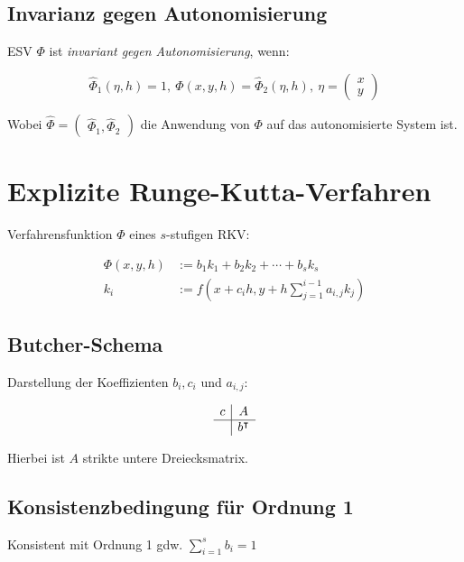 \subsection*{Invarianz gegen Autonomisierung}

ESV $\Phi$ ist \emph{invariant gegen Autonomisierung}, wenn:

$$\widehat{\Phi}_1(\eta,h)=1, \ \Phi(x,y,h) = \widehat{\Phi}_2(\eta,h), \ \eta = \begin{pmatrix}x \\ y\end{pmatrix}$$

Wobei $\widehat{\Phi} = \begin{pmatrix}\widehat{\Phi}_1, \widehat{\Phi}_2\end{pmatrix}$ die Anwendung von $\Phi$ auf das autonomisierte System ist.

\section*{Explizite Runge-Kutta-Verfahren}

Verfahrensfunktion $\Phi$ eines $s$-stufigen RKV:

\vspace*{-4mm}
\begin{align*}
\Phi(x,y,h) &:= b_1 k_1 + b_2 k_2 + \cdots + b_s k_s \\
k_i &:= f(x+c_i h, y + h \sum_{j=1}^{i-1} a_{i,j} k_j)
\end{align*}
\vspace*{-8mm}

\subsection*{Butcher-Schema}

Darstellung der Koeffizienten $b_i, c_i$ und $a_{i,j}$:

$$\begin{array}{c|c}
c & A \\
\hline
  & b^\intercal
\end{array}$$

Hierbei ist $A$ strikte untere Dreiecksmatrix.

\subsection*{Konsistenzbedingung für Ordnung 1}

Konsistent mit Ordnung 1 gdw. $\displaystyle\sum_{i=1}^s b_i = 1$

